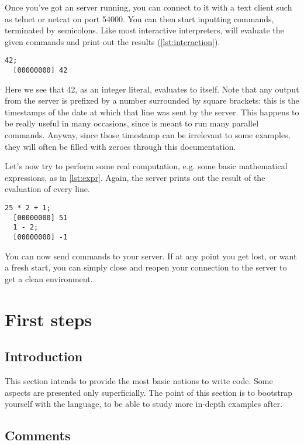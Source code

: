 \documentclass[openright,twoside,12pt]{report}
\begin{document}
Once you've got an \urbi server running, you can connect to it with a
text client such as telnet or netcat on port 54000. You can then start
inputting commands, terminated by semicolons. Like most interactive
interpreters, \urbi will evaluate the given commands and print out the
results (\autoref{lst:interaction}).

\begin{lstlisting}[caption=Evaluating literal values,label=lst:interaction]
  42;
  [00000000] 42
\end{lstlisting}

Here we see that 42, as an integer literal, evaluates to itself. Note
that any output from the server is prefixed by a number surrounded by
square brackets: this is the timestamps of the date at which that line
was sent by the server. This happens to be really useful in many
occasions, since \urbi is meant to run many parallel commands. Anyway,
since those timestamp can be irrelevant to some examples, they will
often be filled with zeroes through this documentation.

Let's now try to perform some real computation, e.g. some basic
mathematical expressions, as in \autoref{lst:expr}. Again, the server prints
out the result of the evaluation of every line.

\begin{lstlisting}[caption=Evaluating composite expressions,label=lst:expr]
  25 * 2 + 1;
  [00000000] 51
  1 - 2;
  [00000000] -1
\end{lstlisting}

You can now send commands to your \urbi server. If at any point you
get lost, or want a fresh start, you can simply close and reopen your
connection to the server to get a clean environment.

\chapter{First steps}

\section{Introduction}

This section intends to provide the most basic notions to write \urbi
code. Some aspects are presented only superficially. The point of this
section is to bootstrap yourself with the \urbi language, to be able
to study more in-depth examples after.

\section{Comments}
\end{document}
